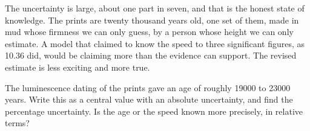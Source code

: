 The uncertainty is large, about one part in seven, and that is the honest state of knowledge. The prints are twenty thousand years old, one set of them, made in mud whose firmness we can only guess, by a person whose height we can only estimate. A model that claimed to know the speed to three significant figures, as \num{10.36} did, would be claiming more than the evidence can support. The revised estimate is less exciting and more true.

\begin{checkbox}
The luminescence dating of the prints gave an age of roughly \num{19000} to \num{23000} years. Write this as a central value with an absolute uncertainty, and find the percentage uncertainty. Is the age or the speed known more precisely, in relative terms?
\end{checkbox}
